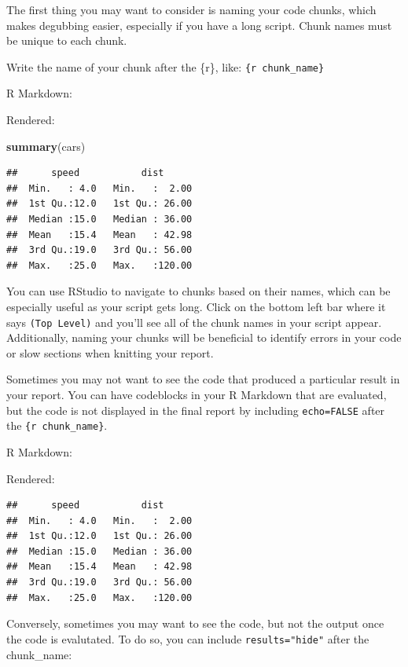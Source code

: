 \documentclass[
]{book}
\newenvironment{Shaded}{\begin{snugshade}}{\end{snugshade}}
\newcommand{\KeywordTok}[1]{\textcolor[rgb]{0.13,0.29,0.53}{\textbf{#1}}}
\newcommand{\NormalTok}[1]{#1}
\begin{document}
The first thing you may want to consider is naming your code chunks, which makes degubbing easier, especially if you have a long script. Chunk names must be unique to each chunk.

Write the name of your chunk after the \{r\}, like: \texttt{\{r\ chunk\_name\}}

R Markdown:

Rendered:

\begin{Shaded}
\begin{Highlighting}[]
\KeywordTok{summary}\NormalTok{(cars)}
\end{Highlighting}
\end{Shaded}

\begin{verbatim}
##      speed           dist       
##  Min.   : 4.0   Min.   :  2.00  
##  1st Qu.:12.0   1st Qu.: 26.00  
##  Median :15.0   Median : 36.00  
##  Mean   :15.4   Mean   : 42.98  
##  3rd Qu.:19.0   3rd Qu.: 56.00  
##  Max.   :25.0   Max.   :120.00
\end{verbatim}

You can use RStudio to navigate to chunks based on their names, which can be especially useful as your script gets long. Click on the bottom left bar where it says \texttt{(Top\ Level)} and you'll see all of the chunk names in your script appear. Additionally, naming your chunks will be beneficial to identify errors in your code or slow sections when knitting your report.

Sometimes you may not want to see the code that produced a particular result in your report. You can have codeblocks in your R Markdown that are evaluated, but the code is not displayed in the final report by including \texttt{echo=FALSE} after the \texttt{\{r\ chunk\_name\}}.

R Markdown:

Rendered:

\begin{verbatim}
##      speed           dist       
##  Min.   : 4.0   Min.   :  2.00  
##  1st Qu.:12.0   1st Qu.: 26.00  
##  Median :15.0   Median : 36.00  
##  Mean   :15.4   Mean   : 42.98  
##  3rd Qu.:19.0   3rd Qu.: 56.00  
##  Max.   :25.0   Max.   :120.00
\end{verbatim}

Conversely, sometimes you may want to see the code, but not the output once the code is evalutated. To do so, you can include \texttt{results="hide"} after the chunk\_name:
\end{document}
